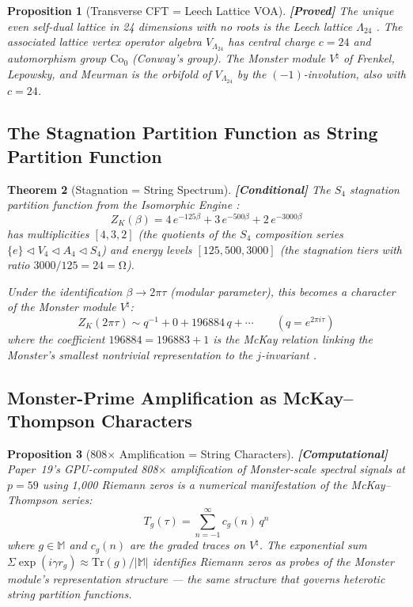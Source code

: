 \documentclass[12pt,a4paper]{article}
\newcommand{\proved}[1]{\textcolor{proved}{\textbf{[Proved]}} #1}
\newcommand{\conditional}[1]{\textcolor{conditional}{\textbf{[Conditional]}} #1}
\newcommand{\computational}[1]{\textcolor{computational}{\textbf{[Computational]}} #1}
\newtheorem{theorem}{Theorem}[section]
\newtheorem{proposition}[theorem]{Proposition}
\theoremstyle{definition}\newtheorem{definition}[theorem]{Definition}
\theoremstyle{remark}\newtheorem{remark}[theorem]{Remark}
\renewcommand{\O}{\mathrm{\Omega}}
\newcommand{\Monster}{\mathbb{M}}
\newcommand{\Leech}{\Lambda_{24}}
\newcommand{\VOA}{V^\natural}
\begin{document}
\begin{proposition}[Transverse CFT = Leech Lattice VOA]
\label{prop:leech_voa}
\proved{The unique even self-dual lattice in 24 dimensions with no roots is
the Leech lattice $\Leech$ \cite{viazovska2017}. The associated lattice vertex
operator algebra $V_\Leech$ has central charge $c = 24$ and automorphism group
$\mathrm{Co}_0$ (Conway's group). The Monster module $\VOA$ of Frenkel,
Lepowsky, and Meurman \cite{flm1988} is the orbifold of $V_\Leech$ by the
$({-}1)$-involution, also with $c = 24$.}
\end{proposition}

\subsection{The Stagnation Partition Function as String Partition Function}

\begin{theorem}[Stagnation = String Spectrum]
\label{thm:partition}
\conditional{The $S_4$ stagnation partition function from the Isomorphic Engine
\cite{paper17}:}
\begin{equation}
  Z_K(\beta) = 4\, e^{-125\beta} + 3\, e^{-500\beta} + 2\, e^{-3000\beta}
  \label{eq:partition}
\end{equation}
has multiplicities $[4, 3, 2]$ (the quotients of the $S_4$ composition series
$\{e\} \triangleleft V_4 \triangleleft A_4 \triangleleft S_4$) and energy levels
$[125, 500, 3000]$ (the stagnation tiers with ratio $3000/125 = 24 = \O$).

Under the identification $\beta \to 2\pi\tau$ (modular parameter), this becomes
a character of the Monster module $\VOA$:
\begin{equation}
  Z_K(2\pi\tau) \sim q^{-1} + 0 + 196884\, q + \cdots
  \qquad (q = e^{2\pi i \tau})
\end{equation}
where the coefficient $196884 = 196883 + 1$ is the McKay relation linking the
Monster's smallest nontrivial representation to the $j$-invariant
\cite{conway_norton1979, borcherds1992}.
\end{theorem}

\subsection{Monster-Prime Amplification as McKay--Thompson Characters}

\begin{proposition}[808$\times$ Amplification = String Characters]
\label{prop:amplification}
\computational{Paper~19's GPU-computed 808$\times$ amplification of Monster-scale
spectral signals at $p = 59$ using 1{,}000 Riemann zeros \cite{paper19} is a
numerical manifestation of the McKay--Thompson series:}
\begin{equation}
  T_g(\tau) = \sum_{n = -1}^{\infty} c_g(n)\, q^n
\end{equation}
where $g \in \Monster$ and $c_g(n)$ are the graded traces on $\VOA$. The
exponential sum $\Sigma \exp(i\gamma r_g) \approx \mathrm{Tr}(g)/|\Monster|$
identifies Riemann zeros as probes of the Monster module's representation
structure --- the same structure that governs heterotic string partition functions.
\end{proposition}
\end{document}
